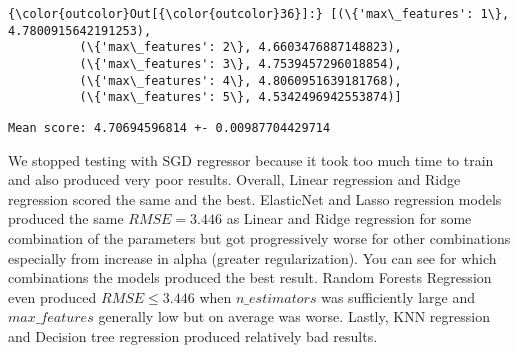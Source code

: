 \documentclass[11pt]{article}
\begin{document}
            \begin{Verbatim}[commandchars=\\\{\}]
{\color{outcolor}Out[{\color{outcolor}36}]:} [(\{'max\_features': 1\}, 4.7800915642191253),
          (\{'max\_features': 2\}, 4.6603476887148823),
          (\{'max\_features': 3\}, 4.7539457296018854),
          (\{'max\_features': 4\}, 4.8060951639181768),
          (\{'max\_features': 5\}, 4.5342496942553874)]
\end{Verbatim}
        
    \begin{Verbatim}[commandchars=\\\{\}]
Mean score: 4.70694596814 +- 0.00987704429714

    \end{Verbatim}

    We stopped testing with SGD regressor because it took too much time to
train and also produced very poor results. Overall, Linear regression
and Ridge regression scored the same and the best. ElasticNet and Lasso
regression models produced the same \(RMSE=3.446\) as Linear and Ridge
regression for some combination of the parameters but got progressively
worse for other combinations especially from increase in alpha (greater
regularization). You can see for which combinations the models produced
the best result. Random Forests Regression even produced
\(RMSE \leq 3.446\) when \(n\_estimators\) was sufficiently large and
\(max\_features\) generally low but on average was worse. Lastly, KNN
regression and Decision tree regression produced relatively bad results.


    
    
    
    
\end{document}
